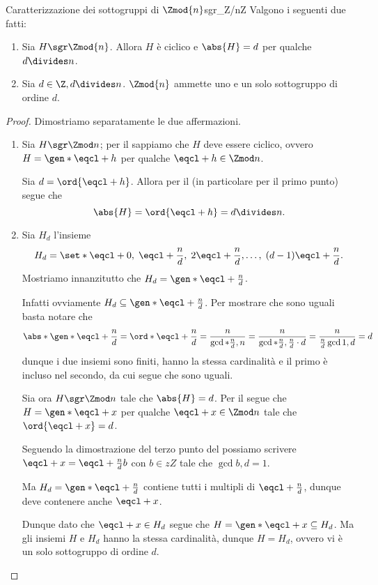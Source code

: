 \begin{proposition}
    {Caratterizzazione dei sottogruppi di $\Zmod{n}$}{sgr_Z/nZ}
    Valgono i seguenti due fatti:
    \begin{enumerate}[label={(\roman*)}]
        \item \label{prop:sgr_Z/nZ:ciclico_ord_d} Sia $H \sgr \Zmod{n}$. Allora $H$ è ciclico e $\abs{H} = d$ per qualche $d \divides n$.
        \item \label{prop:sgr_Z/nZ:unosolo_ord_d} Sia $d \in \Z, d \divides n$. $\Zmod{n}$ ammette uno e un solo sottogruppo di ordine $d$.
    \end{enumerate}
\end{proposition}
\begin{proof}
    Dimostriamo separatamente le due affermazioni.
    \begin{enumerate} [label={(\roman*)}]
        \item Sia $H \sgr \Zmod n$; per il  sappiamo che $H$ deve essere ciclico, ovvero $H = \gen*{\eqcl+ h}$ per qualche $\eqcl+ h \in \Zmod n$.
        
        Sia $d = \ord{\eqcl+ h}$. Allora per il  (in particolare per il primo punto) segue che \[
            \abs{H} = \ord{\eqcl+ h} = d \divides n.   
        \]
        \item Sia $H_d$ l'insieme \[
            H_d = \set*{\eqcl+ 0,\; \eqcl+{\frac{n}{d}},\; 2\eqcl+{\frac{n}{d}}, \dots,\; (d-1)\eqcl+{\frac{n}{d}}}.    
        \] Mostriamo innanzitutto che $H_d = \gen*{\eqcl+{\frac{n}{d}}}$.
        
        Infatti ovviamente $H_d \subseteq \gen*{\eqcl+{\frac{n}{d}}}$. Per mostrare che sono uguali basta notare che \[
            \abs*{\gen*{\eqcl+{\frac{n}{d}}}} = 
            \ord*{\eqcl+{\frac{n}{d}}} = 
            \frac{n}{\gcd*{\frac{n}{d}, n}} = 
            \frac{n}{\gcd*{\frac{n}{d}, \frac{n}{d} \cdot d}} = 
            \frac{n}{\frac{n}{d}\gcd{1, d}} = 
            d
        \] dunque i due insiemi sono finiti, hanno la stessa cardinalità e il primo è incluso nel secondo, da cui segue che sono uguali.

        Sia ora $H \sgr \Zmod n$ tale che $\abs{H} = d$. Per il  segue che $H = \gen*{\eqcl+ x}$ per qualche $\eqcl+ x \in \Zmod n$ tale che $\ord{\eqcl+ x} = d$.

        Seguendo la dimostrazione del terzo punto del  possiamo scrivere $\eqcl+ x = \eqcl+{\frac{n}{d}}b$ con $b \in zZ$ tale che $\gcd{b, d} = 1$.

        Ma $H_d = \gen*{\eqcl+{\frac{n}{d}}}$ contiene tutti i multipli di $\eqcl+{\frac{n}{d}}$, dunque deve contenere anche $\eqcl+ x$.

        Dunque dato che $\eqcl+ x \in H_d$ segue che $H = \gen*{\eqcl+ x} \subseteq H_d$. Ma gli insiemi $H$ e $H_d$ hanno la stessa cardinalità, dunque $H = H_d$, ovvero vi è un solo sottogruppo di ordine $d$. \qedhere
    \end{enumerate}
\end{proof}
